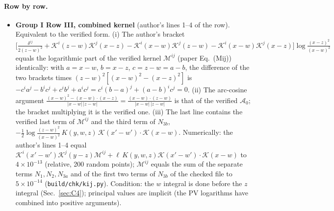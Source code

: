 \paragraph{Row by row.}
\begin{itemize}
\item[A1] \textbf{Group I Row III, combined kernel} (author's lines 1--4 of the row). Equivalent to the verified form. (i) The author's bracket $\big[\frac{\delta^{ij}}{2(z-w)^{2}}+\mathcal{K}^{i}(z-w)\mathcal{K}^{j}(x-z)-\mathcal{K}^{i}(x-w)\mathcal{K}^{j}(z-w)-\mathcal{K}^{i}(x-w)\mathcal{K}^{j}(x-z)\big]\log\frac{(x-z)^{2}}{(x-w)^{2}}$ equals the logarithmic part of the verified kernel $\mathcal{M}^{ij}$ (paper Eq.~(Mij)) identically: with $a=x-w$, $b=x-z$, $c=z-w=a-b$, the difference of the two brackets times $(z-w)^{2}[(x-w)^{2}-(x-z)^{2}]$ is $-c^{i}a^{j}-b^{i}c^{j}+c^{i}b^{j}+a^{i}c^{j}=c^{i}(b-a)^{j}+(a-b)^{i}c^{j}=0$. (ii) The arc-cosine argument $\frac{(x-w)^{2}-(x-w)\cdot(x-z)}{|x-w|\,|z-w|}=\frac{(x-w)\cdot(z-w)}{|x-w|\,|z-w|}$ is that of the verified $\mathcal{A}_{0}$; the bracket multiplying it is the verified one. (iii) The last line contains the verified last term of $\mathcal{M}^{ij}$ and the third term of $N_{3b}$, $-\frac12\log\frac{(z-w)^{2}}{(x-w)^{2}}\,K(y,w,z)\,\mathcal{K}(x'-w')\cdot\mathcal{K}(x-w)$. Numerically: the author's lines 1--4 equal $\mathcal{K}^{i}(x'-w')\mathcal{K}^{j}(y-z)\mathcal{M}^{ij}+\ell\,K(y,w,z)\mathcal{K}(x'-w')\cdot\mathcal{K}(x-w)$ to $4\times10^{-13}$ (relative, 200 random points); $\mathcal{M}^{ij}$ equals the sum of the separate terms $N_{1},N_{2},N_{3a}$ and of the first two terms of $N_{3b}$ of the checked file to $5\times10^{-14}$ (\texttt{build/chk/kij.py}). Condition: the $w$ integral is done before the $z$ integral (Sec.~\ref{sec:C4}); principal values are implicit (the PV logarithms have combined into positive arguments).

\end{itemize}
